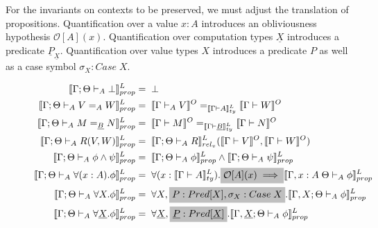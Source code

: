 \documentclass[acmsmall]{acmart}
\newcommand{\den}[1]{\llbracket #1\rrbracket}
\begin{document}
For the invariants on contexts to be preserved, we must adjust the translation of propositions. Quantification over a value $x : A$ introduces an obliviousness hypothesis $\mathcal{O}[A](x)$. Quantification over computation types $\underline{X}$ introduces a predicate $\underline{P}_{\underline{X}}$. Quantification over value types $X$ introduces a predicate $P$ as well as a case symbol $\sigma_X : Case\;X$.

\begin{figure}[H]
  \centering
  \scriptsize
  \begin{align*}
    \den{\Gamma;\Theta\vdash_A \bot}^L_{prop}  &=\; \bot \\
    \den{\Gamma;\Theta\vdash_A V =_A W}^L_{prop} &=\; \den{\Gamma \vdash _AV}^O =_{\den{\Gamma \vdash A}^L_{ty}}  \den{\Gamma \vdash W}^O \\
    \den{\Gamma;\Theta\vdash_A M =_{\underline{B}} N}^L_{prop} &=\;     \den{\Gamma \vdash M}^O =_{\den{\Gamma \vdash \underline{B}}^L_{ty}}   \den{\Gamma  \vdash N}^O \\
    \den{\Gamma;\Theta\vdash_A R(V,W)}^L_{prop} &=\;   \den{\Gamma ;\Theta\vdash _AR}^L_{rel_v}(  \den{\Gamma \vdash V}^O,   \den{\Gamma \vdash W}^O) \\
    \den{\Gamma;\Theta\vdash_A \phi \land \psi}^L_{prop} &=\;   \den{\Gamma;\Theta\vdash_A \phi}^L_{prop} \land \den{\Gamma;\Theta\vdash_A \psi}^L_{prop} \\
    \den{\Gamma;\Theta\vdash_A \forall(x:A).\phi}^L_{prop} &=\;   \forall(x:\den{\Gamma  \vdash A}^L_{ty}).\colorbox{lightgray}{$\mathcal{O}[A](x)\implies$}\den{\Gamma,x : A\;\Theta\vdash_A \phi}^L_{prop} \\
    \den{\Gamma;\Theta\vdash_A \forall X.\phi}^L_{prop} &=\;   \forall X,\colorbox{lightgray}{$P : Pred[X],\sigma_X:Case\;X$}.\den{\Gamma,X;\Theta\vdash_A \phi}^L_{prop}\\
    \den{\Gamma;\Theta\vdash_A \forall \underline{X}.\phi}^L_{prop} &=\;   \forall \underline{X},\colorbox{lightgray}{$\underline{P}:Pred[\underline{X}]$}.\den{\Gamma,\underline{X};\Theta\vdash_A \phi}^L_{prop} \\

\end{align*}
\end{figure}
\end{document}
